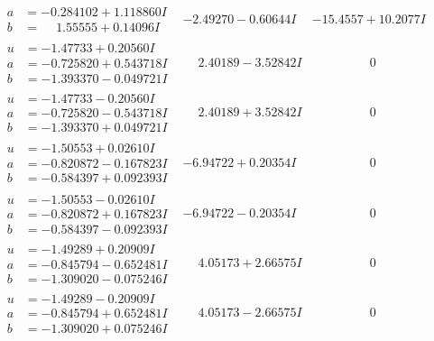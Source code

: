 \documentclass[1p]{elsarticle_modified}
\theoremstyle{definition}
\begin{document}
$$\begin{array}{c|c|c}
\begin{aligned}
a &= -0.284102 + 1.118860 I \\
b &= \phantom{-}1.55555 + 0.14096 I\end{aligned}
 & -2.49270 - 0.60644 I & -15.4557 + 10.2077 I \\ \hline\begin{aligned}
u &= -1.47733 + 0.20560 I \\
a &= -0.725820 + 0.543718 I \\
b &= -1.393370 - 0.049721 I\end{aligned}
 & \phantom{-}2.40189 - 3.52842 I & \phantom{-0.000000 } 0 \\ \hline\begin{aligned}
u &= -1.47733 - 0.20560 I \\
a &= -0.725820 - 0.543718 I \\
b &= -1.393370 + 0.049721 I\end{aligned}
 & \phantom{-}2.40189 + 3.52842 I & \phantom{-0.000000 } 0 \\ \hline\begin{aligned}
u &= -1.50553 + 0.02610 I \\
a &= -0.820872 - 0.167823 I \\
b &= -0.584397 + 0.092393 I\end{aligned}
 & -6.94722 + 0.20354 I & \phantom{-0.000000 } 0 \\ \hline\begin{aligned}
u &= -1.50553 - 0.02610 I \\
a &= -0.820872 + 0.167823 I \\
b &= -0.584397 - 0.092393 I\end{aligned}
 & -6.94722 - 0.20354 I & \phantom{-0.000000 } 0 \\ \hline\begin{aligned}
u &= -1.49289 + 0.20909 I \\
a &= -0.845794 - 0.652481 I \\
b &= -1.309020 - 0.075246 I\end{aligned}
 & \phantom{-}4.05173 + 2.66575 I & \phantom{-0.000000 } 0 \\ \hline\begin{aligned}
u &= -1.49289 - 0.20909 I \\
a &= -0.845794 + 0.652481 I \\
b &= -1.309020 + 0.075246 I\end{aligned}
 & \phantom{-}4.05173 - 2.66575 I & \phantom{-0.000000 } 0 \\ \hline\begin{aligned}

\end{aligned}
\end{array}$$
\end{document}
